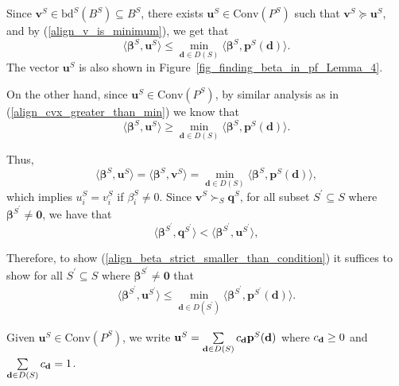 \documentclass[prodmode,acmtompecs]{acmsmall}
\newcommand{\succS}[1]{\succ_{#1}}
\begin{document}
Since $\mathbf{v}^S \in \text{bd}^S(B^S) \subseteq B^S$, there exists $\mathbf{u}^S \in \text{Conv}(P^S)$ such that $\mathbf{v}^S \succeq \mathbf{u}^S$, and by (\ref{align_v_is_minimum}), we get that
$$
\langle \boldsymbol{\beta}^S, \mathbf{u}^S \rangle \leq \min\limits_{\mathbf{d} \in D(S)} \langle \boldsymbol{\beta}^S, \mathbf{p}^S(\mathbf{d}) \rangle. 
$$
The vector $\mathbf{u}^S$ is also shown in Figure{~\ref{fig_finding_beta_in_pf_Lemma_4}}. 

On the other hand, since $\mathbf{u}^S \in \text{Conv}(P^S)$, by similar analysis as in (\ref{align_cvx_greater_than_min}) we know that
$$
\langle \boldsymbol{\beta}^S, \mathbf{u}^S \rangle \geq \min\limits_{\mathbf{d} \in D(S)} \langle \boldsymbol{\beta}^S, \mathbf{p}^S(\mathbf{d}) \rangle. 
$$

Thus, 
$$
\langle \boldsymbol{\beta}^S, \mathbf{u}^S \rangle = \langle \boldsymbol{\beta}^S, \mathbf{v}^S \rangle = \min\limits_{\mathbf{d} \in D(S)} \langle \boldsymbol{\beta}^S, \mathbf{p}^S(\mathbf{d}) \rangle, 
$$
which implies $u_i^S = v_i^S$ if $\beta_i^S \neq 0$. Since $\mathbf{v}^S \succS{S} \mathbf{q}^S$, for all subset $S^\prime \subseteq S$ where $\boldsymbol{\beta}^{S^\prime} \neq \mathbf{0}$, we have that
$$
\langle \boldsymbol{\beta}^{S^\prime}, \mathbf{q}^{S^\prime} \rangle < \langle \boldsymbol{\beta}^{S^\prime}, \mathbf{u}^{S^\prime} \rangle, 
$$

Therefore, to show (\ref{align_beta_strict_smaller_than_condition}) it suffices to show for all $S^\prime \subseteq S$ where $\boldsymbol{\beta}^{S^\prime} \neq \mathbf{0}$ that
\begin{align}
\label{align_beta_S_prime_u_S_prime}
\langle \boldsymbol{\beta}^{S^\prime}, \mathbf{u}^{S^\prime} \rangle \leq \min\limits_{\mathbf{d} \in D(S^\prime)} \langle \boldsymbol{\beta}^{S^\prime},  \mathbf{p}^{S^\prime}(\mathbf{d}) \rangle. 
\end{align}

Given $\mathbf{u}^S \in \text{Conv}(P^S)$, we write $\mathbf{u}^S = \sum\limits_{\mathbf{d} \in D(S)}c_\mathbf{d} \mathbf{p}^S(\mathbf{d})$ where $c_\mathbf{d} \geq 0$ and $\sum\limits_{\mathbf{d} \in D(S)} c_\mathbf{d} = 1$. 
\end{document}
